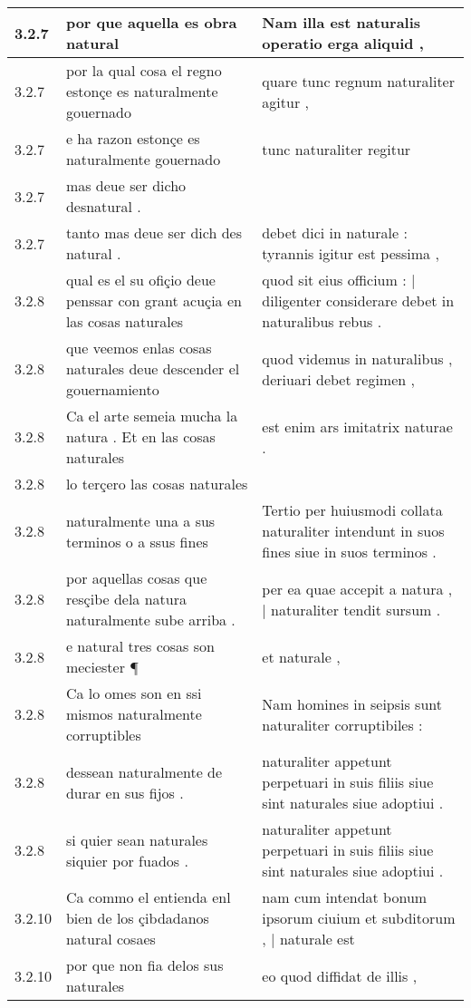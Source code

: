 \begin{tabular}{|p{1cm}|p{6.5cm}|p{6.5cm}|}
3.2.7 & por que aquella es obra natural & Nam illa est naturalis operatio erga aliquid , \\\hline
3.2.7 & por la qual cosa el regno estonçe es naturalmente gouernado & quare tunc regnum naturaliter agitur , \\\hline
3.2.7 & e ha razon estonçe es naturalmente gouernado & tunc naturaliter regitur \\\hline
3.2.7 & mas deue ser dicho desnatural . &  \\\hline
3.2.7 & tanto mas deue ser dich des natural . & debet dici in naturale : tyrannis igitur est pessima , \\\hline
3.2.8 & qual es el su ofiçio deue penssar con grant acuçia en las cosas naturales & quod sit eius officium : | diligenter considerare debet in naturalibus rebus . \\\hline
3.2.8 & que veemos enlas cosas naturales deue descender el gouernamiento & quod videmus in naturalibus , deriuari debet regimen , \\\hline
3.2.8 & Ca el arte semeia mucha la natura . Et en las cosas naturales & est enim ars imitatrix naturae . \\\hline
3.2.8 & lo terçero las cosas naturales &  \\\hline
3.2.8 & naturalmente una a sus terminos o a ssus fines & Tertio per huiusmodi collata naturaliter intendunt in suos fines siue in suos terminos . \\\hline
3.2.8 & por aquellas cosas que resçibe dela natura naturalmente sube arriba . & per ea quae accepit a natura , | naturaliter tendit sursum . \\\hline
3.2.8 & e natural tres cosas son meciester ¶ & et naturale , \\\hline
3.2.8 & Ca lo omes son en ssi mismos naturalmente corruptibles & Nam homines in seipsis sunt naturaliter corruptibiles : \\\hline
3.2.8 & dessean naturalmente de durar en sus fijos . & naturaliter appetunt perpetuari in suis filiis siue sint naturales siue adoptiui . \\\hline
3.2.8 & si quier sean naturales siquier por fuados . & naturaliter appetunt perpetuari in suis filiis siue sint naturales siue adoptiui . \\\hline
3.2.10 & Ca commo el entienda enl bien de los çibdadanos natural cosaes & nam cum intendat bonum ipsorum ciuium et subditorum , | naturale est \\\hline
3.2.10 & por que non fia delos sus naturales & eo quod diffidat de illis , \\\hline

\end{tabular}

